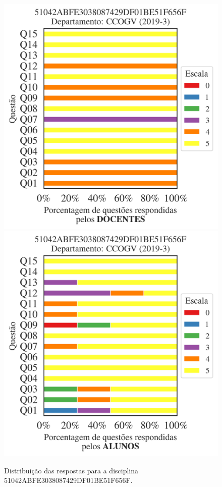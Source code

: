 \documentclass[a4paper,10pt]{article}
\begin{document}
\begin{figure}[h]
\centering
\includegraphics[width=0.485\linewidth]{analise_disciplina_departamento_CCOGV_51042ABFE3038087429DF01BE51F656F_docentes.png}
\includegraphics[width=0.485\linewidth]{analise_disciplina_departamento_CCOGV_51042ABFE3038087429DF01BE51F656F_alunos.png}
\caption{\label{fig:analise_geral_departamento}                Distribuição das respostas para a disciplina 51042ABFE3038087429DF01BE51F656F. }
\end{figure}
\end{document}
